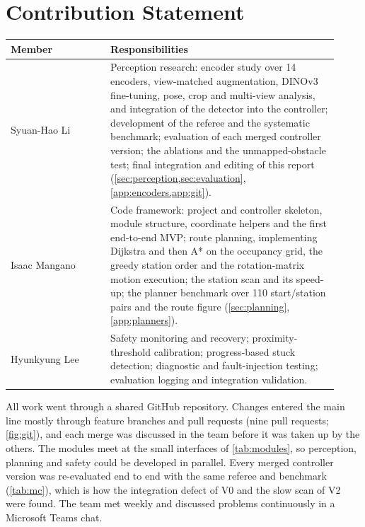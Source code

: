 \section*{Contribution Statement}
\label{sec:contribution}

\begin{center}
  \small
  \begin{tabular}{@{}p{0.28\linewidth}>{\raggedright\arraybackslash}p{0.64\linewidth}@{}}
    \toprule
    Member & Responsibilities \\
    \midrule
    Syuan-Hao Li            & Perception research: encoder study over 14 encoders, view-matched augmentation, DINOv3 fine-tuning, pose, crop and multi-view analysis, and integration of the detector into the controller; development of the referee and the systematic benchmark; evaluation of each merged controller version; the ablations and the unmapped-obstacle test; final integration and editing of this report (\cref{sec:perception,sec:evaluation}, \cref{app:encoders,app:git}). \\
    Isaac Mangano           & Code framework: project and controller skeleton, module structure, coordinate helpers and the first end-to-end MVP; route planning, implementing Dijkstra and then A* on the occupancy grid, the greedy station order and the rotation-matrix motion execution; the station scan and its speed-up; the planner benchmark over 110 start/station pairs and the route figure (\cref{sec:planning}, \cref{app:planners}). \\
    Hyunkyung Lee           & Safety monitoring and recovery; proximity-threshold calibration; progress-based stuck detection; diagnostic and fault-injection testing; evaluation logging and integration validation. \\
    \bottomrule
  \end{tabular}
\end{center}

 All work went through a shared GitHub repository. Changes entered the main line mostly through feature branches and pull requests (nine pull requests; \cref{fig:git}), and each merge was discussed in the team before it was taken up by the others. The modules meet at the small interfaces of \cref{tab:modules}, so perception, planning and safety could be developed in parallel. Every merged controller version was re-evaluated end to end with the same referee and benchmark (\cref{tab:mc}), which is how the integration defect of V0 and the slow scan of V2 were found. The team met weekly and discussed problems continuously in a Microsoft Teams chat.
